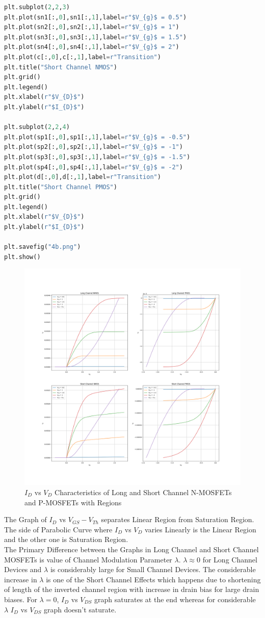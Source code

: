 \documentclass{article}
\begin{document}
\begin{lstlisting}[language=Python]
plt.subplot(2,2,3)
plt.plot(sn1[:,0],sn1[:,1],label=r"$V_{g}$ = 0.5")
plt.plot(sn2[:,0],sn2[:,1],label=r"$V_{g}$ = 1")
plt.plot(sn3[:,0],sn3[:,1],label=r"$V_{g}$ = 1.5")
plt.plot(sn4[:,0],sn4[:,1],label=r"$V_{g}$ = 2")
plt.plot(c[:,0],c[:,1],label=r"Transition")
plt.title("Short Channel NMOS")
plt.grid()
plt.legend()
plt.xlabel(r"$V_{D}$")
plt.ylabel(r"$I_{D}$")

plt.subplot(2,2,4)
plt.plot(sp1[:,0],sp1[:,1],label=r"$V_{g}$ = -0.5")
plt.plot(sp2[:,0],sp2[:,1],label=r"$V_{g}$ = -1")
plt.plot(sp3[:,0],sp3[:,1],label=r"$V_{g}$ = -1.5")
plt.plot(sp4[:,0],sp4[:,1],label=r"$V_{g}$ = -2")
plt.plot(d[:,0],d[:,1],label=r"Transition")
plt.title("Short Channel PMOS")
plt.grid()
plt.legend()
plt.xlabel(r"$V_{D}$")
plt.ylabel(r"$I_{D}$")

plt.savefig("4b.png")
plt.show()
\end{lstlisting}

\begin{figure}[!ht]
    \centering
    \includegraphics[scale=0.34]{Images/4b.png}
    \caption{$I_D$ vs $V_D$ Characteristics of Long and Short Channel N-MOSFETs and P-MOSFETs with Regions}
\end{figure}
The Graph of $I_D$ vs $V_{GS} - V_{Th}$ separates Linear Region from Saturation Region. The side of Parabolic Curve where $I_D$ vs $V_{D}$ varies Linearly is the Linear Region and the other one is Saturation Region.\\
\quad The Primary Difference between the Graphs in Long Channel and Short Channel MOSFETs is value of Channel Modulation Parameter $\lambda$. $\lambda \approx 0$ for Long Channel Devices and $\lambda$ is considerably large for Small Channel Devices. The considerable increase in $\lambda$ is one of the Short Channel Effects which happens due to shortening of length of the inverted channel region with increase in drain bias for large drain biases. For $\lambda = 0$, $I_D$ vs $V_{DS}$ graph saturates at the end whereas for considerable $\lambda$ $I_D$ vs $V_{DS}$ graph doesn't saturate.
\end{document}
